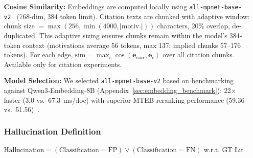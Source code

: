 \textbf{Cosine Similarity:} Embeddings are computed locally using \texttt{all-mpnet-base-v2}~\cite{reimers2019sentencebert} (768-dim, 384 token limit). Citation texts are chunked with adaptive window: chunk size $= \max(256, \min(4000, |\text{motiv.}|))$ characters, 20\% overlap, de-duplicated. This adaptive sizing ensures chunks remain within the model's 384-token context (motivations average 56 tokens, max 137; implied chunks 57--176 tokens). For each edge, $\text{sim} = \max_c \cos(\mathbf{e}_{\text{narr}}, \mathbf{e}_c)$ over all citation chunks. Available only for citation experiments.

\textbf{Model Selection:} We selected \texttt{all-mpnet-base-v2} based on benchmarking against Qwen3-Embedding-8B (Appendix~\ref{sec:embedding_benchmark}): 22$\times$ faster (3.0 vs.\ 67.3~ms/doc) with superior MTEB reranking performance (59.36 vs.\ 51.56)~\cite{muennighoff2023mteb}.

\subsubsection{Hallucination Definition}
$\text{Hallucination} = (\text{Classification} = \text{FP}) \lor (\text{Classification} = \text{FN})$ w.r.t. GT Lit

